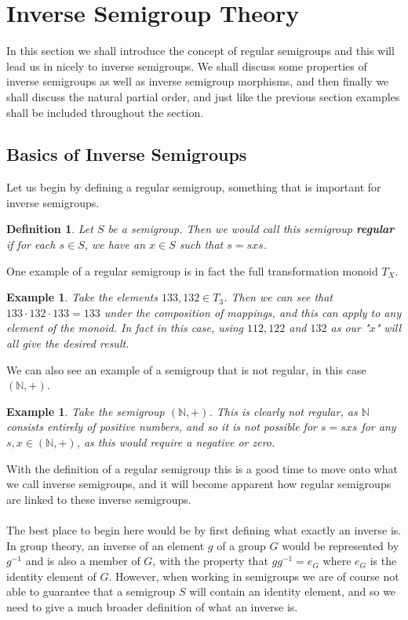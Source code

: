 \documentclass[12pt]{article}
\newtheorem{defn}[theorem]{Definition}
\newtheorem{ex}[theorem]{Example}
\begin{document}
\section{Inverse Semigroup Theory}
In this section we shall introduce the concept of regular semigroups and this will lead us in nicely to inverse semigroups. We shall discuss some properties of inverse semigroups as well as inverse semigroup morphisms, and then finally we shall discuss the natural partial order, and just like the previous section examples shall be included throughout the section.
\subsection{Basics of Inverse Semigroups}
Let us begin by defining a regular semigroup, something that is important for inverse semigroups.
\begin{defn}
	Let $S$ be a semigroup. Then we would call this semigroup \textbf{regular} if for each $s \in S$, we have an $x \in S$ such that $s=sxs$.
\end{defn}
\noindent One example of a regular semigroup is in fact the full transformation monoid $T_X$\cite{1}.
\begin{ex}\label{ex2.18}
	Take the elements $133,132 \in T_3$. Then we can see that $133 \cdot 132 \cdot 133 = 133$ under the composition of mappings, and this can apply to any element of the monoid. In fact in this case, using $112, 122$ and $132$ as our "$x$" will all give the desired result.
\end{ex}
\noindent We can also see an example of a semigroup that is not regular, in this case $(\mathbb{N}, +)$.
\begin{ex}
	Take the semigroup $(\mathbb{N},+)$. This is clearly not regular, as $\mathbb{N}$ consists entirely of positive numbers, and so it is not possible for $s = sxs$ for any $s,x \in (\mathbb{N},+)$, as this would require a negative or zero.
\end{ex}
\noindent With the definition of a regular semigroup this is a good time to move onto what we call inverse semigroups, and it will become apparent how regular semigroups are linked to these inverse semigroups.\\
\\The best place to begin here would be by first defining what exactly an inverse is. In group theory, an inverse of an element $g$ of a group $G$ would be represented by $g^{-1}$ and is also a member of $G$, with the property that $gg^{-1} = e_G$ where $e_G$ is the identity element of $G$. However, when working in semigroups we are of course not able to guarantee that a semigroup $S$ will contain an identity element, and so we need to give a much broader definition of what an inverse is.
\end{document}
